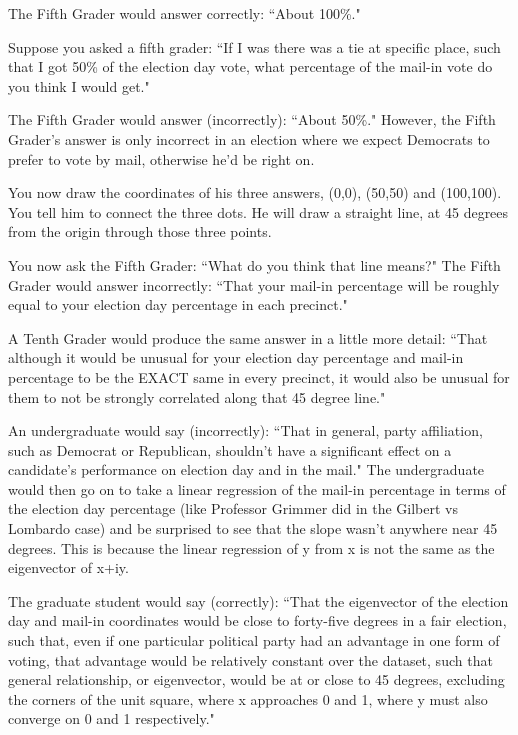 \documentclass[preprint,13pt]{elsarticle}
\begin{document}
The Fifth Grader would answer correctly: ``About 100\%."

Suppose you asked a fifth grader: ``If I was there was a tie at specific place, such that I got 50\% of the election day vote, what percentage of the mail-in vote do you think I would get."

The Fifth Grader would answer (incorrectly): ``About 50\%." However, the Fifth Grader's answer is only incorrect in an election where we expect Democrats to prefer to vote by mail, otherwise he'd be right on.

You now draw the coordinates of his three answers, (0,0), (50,50) and (100,100). You tell him to connect the three dots. He will draw a straight line, at 45 degrees from the origin through those three points.

You now ask the Fifth Grader: ``What do you think that line means?" The Fifth Grader would answer incorrectly: ``That your mail-in percentage will be roughly equal to your election day percentage in each precinct."

A Tenth Grader would produce the same answer in a little more detail: ``That although it would be unusual for your election day percentage and mail-in percentage to be the EXACT same in every precinct, it would also be unusual for them to not be strongly correlated along that 45 degree line."

An undergraduate would say (incorrectly): ``That in general, party affiliation, such as Democrat or Republican, shouldn't have a significant effect on a candidate's performance on election day and in the mail." The undergraduate would then go on to take a linear regression of the mail-in percentage in terms of the election day percentage (like Professor Grimmer did in the Gilbert vs Lombardo case) and be surprised to see that the slope wasn't anywhere near 45 degrees. This is because the linear regression of y from x is not the same as the eigenvector of x+iy.

The graduate student would say (correctly): ``That the eigenvector of the election day and mail-in coordinates would be close to forty-five degrees in a fair election, such that, even if one particular political party had an advantage in one form of voting, that advantage would be relatively constant over the dataset, such that general relationship, or eigenvector, would be at or close to 45 degrees, excluding the corners of the unit square, where x approaches 0 and 1, where y must also converge on 0 and 1 respectively."
\end{document}
